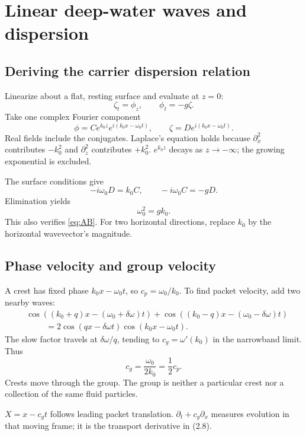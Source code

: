 \section{Linear deep-water waves and dispersion}
\label{sec:dispersion}
\subsection{Deriving the carrier dispersion relation}
Linearize about a flat, resting surface and evaluate at $z=0$:
\begin{equation}\label{eq:linear-bc}
 \zeta_t=\phi_z,\qquad \phi_t=-g\zeta.
\end{equation}
Take one complex Fourier component
\[
 \phi=Ce^{k_0z}e^{i(k_0x-\omega_0t)},\qquad
 \zeta=De^{i(k_0x-\omega_0t)}.
\]
Real fields include the conjugates. Laplace's equation holds because
$\partial_x^2$ contributes $-k_0^2$ and $\partial_z^2$ contributes $+k_0^2$.
$e^{k_0z}$ decays as $z\to-\infty$; the growing exponential is excluded.

The surface conditions give
\[
 -i\omega_0D=k_0C,\qquad -i\omega_0C=-gD.
\]
Elimination yields
\begin{equation}\label{eq:carrier-dispersion}
 \boxed{\omega_0^2=gk_0.}
\end{equation}
This also verifies \eqref{eq:AB}. For two horizontal directions, replace
$k_0$ by the horizontal wavevector's magnitude.

\subsection{Phase velocity and group velocity}
A crest has fixed phase $k_0x-\omega_0t$, so $c_p=\omega_0/k_0$.
To find packet velocity, add two nearby waves:
\begin{align*}
 &\cos((k_0+q)x-(\omega_0+\delta\omega)t)
 +\cos((k_0-q)x-(\omega_0-\delta\omega)t)\\
 &\hspace{1cm}=2\cos(qx-\delta\omega t)\cos(k_0x-\omega_0t).
\end{align*}
The slow factor travels at $\delta\omega/q$, tending to
$c_g=\omega'(k_0)$ in the narrowband limit. Thus
\begin{equation}\label{eq:group-speed}
 c_g=\frac{\omega_0}{2k_0}=\frac12c_p.
\end{equation}
Crests move through the group. The group is neither a particular crest nor
a collection of the same fluid particles.

$X=x-c_gt$ follows leading packet translation.
$\partial_t+c_g\partial_x$ measures evolution in that moving frame;
it is the transport derivative in (2.8).

